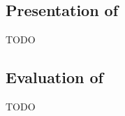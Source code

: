 \subsection[Presentation of Vakkuri et al. (2020)]{Presentation of \textcite{Vakkuri_2020}}
TODO

\subsection[Evaluation of Vakkuri et al. (2020)]{Evaluation of \textcite{Vakkuri_2020}}
TODO